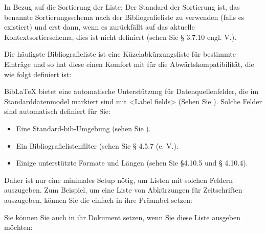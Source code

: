\documentclass{ltxdockit}[2011/03/25]
\newcommand*{\biblatex}{BibLaTeX\xspace}
\begin{document}
\begin{ltxsyntax}
In Bezug auf die Sortierung der Liste: Der Standard der Sortierung ist, das 
benannte Sortierungsschema nach der Bibliografieliste zu verwenden  (falls es existiert)
und erst dann, wenn es zurückfällt auf das aktuelle Kontextsortierschema, dies ist nicht definiert (sehen Sie %
    § 3.7.10 engl. V.).

Die häufigste Bibliografieliste ist eine Küzelabkürzungsliste für bestimmte Einträge 
und so hat diese einen Komfort mit  für die Abwärtskompatibilität, die wie folgt definiert ist:

\begin{ltxexample}
\end{ltxexample}

\biblatex bietet eine automatische Unterstützung für Datenquellenfelder, die im
Standarddatenmodel markiert sind mit <Label fields> (Sehen Sie
). Solche Felder sind automatisch definiert für Sie:

\begin{itemize}
\item Eine Standard-bib-Umgebung (sehen Sie ).
\item Ein Bibliografielistenfilter (sehen Sie § 4.5.7 (e. V.). %
\item Einige unterstützte Formate und Längen (sehen Sie §4.10.5 und § 4.10.4).
\end{itemize}
%
Daher ist nur eine minimales Setup nötig, um Listen mit solchen Feldern auszugeben.
Zum Beispiel, um eine Liste von Abkürzungen für Zeitschriften auszugeben, können Sie die einfach in ihre Präambel setzen: 

\begin{ltxexample}
\end{ltxexample}
%
Sie können Sie auch in ihr Dokument setzen, wenn Sie diese Liste ausgeben möchten:


\end{ltxsyntax}
\end{document}

